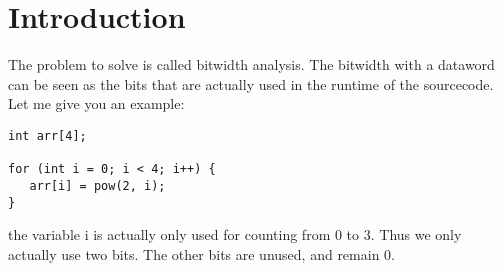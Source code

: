 \chapter{Introduction}\label{sec:intro}

The problem to solve is called bitwidth analysis.
The bitwidth with a dataword can be seen as the bits that are actually used in the runtime of the sourcecode.
Let me give you an example:
\begin{lstlisting}[frame=single]
int arr[4];

for (int i = 0; i < 4; i++) {
   arr[i] = pow(2, i);
}
\end{lstlisting}
the variable i is actually only used for counting from 0 to 3.
Thus we only actually use two bits. The other bits are unused, and remain 0.



